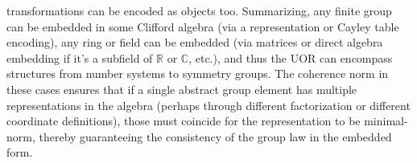 \documentclass[12pt]{article}
\begin{document}
\begin{itemize}
transformations can be encoded as objects too. Summarizing, any finite group can be embedded in some Clifford algebra (via a representation or Cayley table encoding), any ring or field can be embedded (via matrices or direct algebra embedding if it’s a subfield of $\mathbb{R}$ or $\mathbb{C}$, etc.), and thus the UOR can encompass structures from number systems to symmetry groups. The coherence norm in these cases ensures that if a single abstract group element has multiple representations in the algebra (perhaps through different factorization or different coordinate definitions), those must coincide for the representation to be minimal-norm, thereby guaranteeing the consistency of the group law in the embedded form.

\end{itemize}
\end{document}
